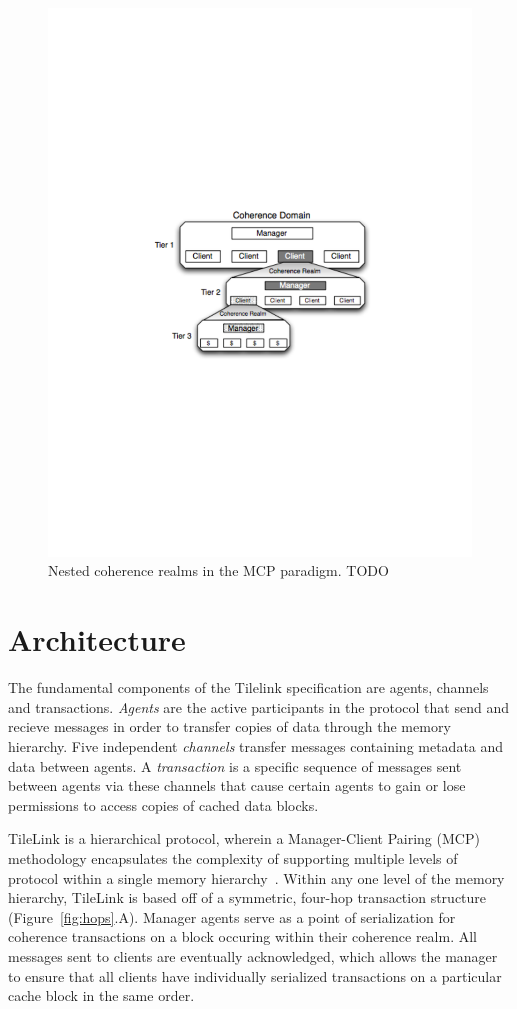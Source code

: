 \begin{figure}[t!]
\centering
\includegraphics[width=0.8\columnwidth]{tilelink/figures/mcp-realm.pdf}
\caption{Nested coherence realms in the MCP paradigm. TODO }
\label{fig:mcp}
\end{figure}

\section{Architecture}
\label{s.arch}

The fundamental components of the Tilelink specification are agents, channels and transactions.
{\em Agents} are the active participants in the protocol that send and recieve messages in order to transfer copies of data through the memory hierarchy.
Five independent {\em channels} transfer messages containing metadata and data between agents.
A {\em transaction} is a specific sequence of messages sent between agents via these channels
that cause certain agents to gain or lose permissions to access copies of cached data blocks.

TileLink is a hierarchical protocol, wherein a Manager-Client Pairing (MCP) methodology encapsulates the complexity of supporting
multiple levels of protocol within a single memory hierarchy~\cite{beu2011manager}.
Within any one level of the memory hierarchy, TileLink is based off of a symmetric, four-hop transaction structure (Figure~\ref{fig:hops}.A).
Manager agents serve as a point of serialization for coherence transactions on a block occuring within their coherence realm.
All messages sent to clients are eventually acknowledged, which allows the manager to ensure that all clients have
individually serialized transactions on a particular cache block in the same order.

